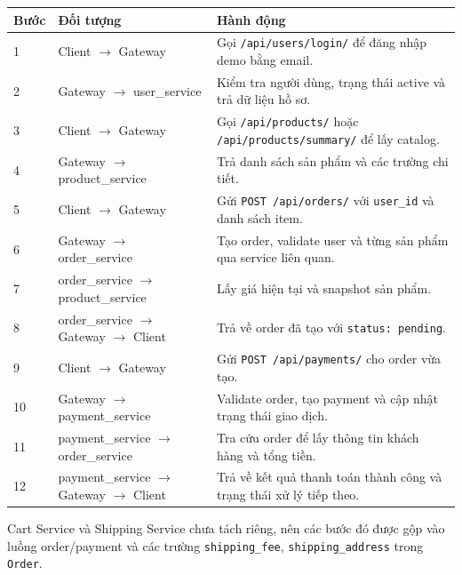 \documentclass[12pt,a4paper]{article}
\begin{document}
\begin{longtable}{p{1.4cm}p{3.6cm}p{8.2cm}}
\toprule
\textbf{Bước} & \textbf{Đối tượng} & \textbf{Hành động} \\
\midrule
1 & Client $\rightarrow$ Gateway & Gọi \texttt{/api/users/login/} để đăng nhập demo bằng email. \\
2 & Gateway $\rightarrow$ user\_service & Kiểm tra người dùng, trạng thái active và trả dữ liệu hồ sơ. \\
3 & Client $\rightarrow$ Gateway & Gọi \texttt{/api/products/} hoặc \texttt{/api/products/summary/} để lấy catalog. \\
4 & Gateway $\rightarrow$ product\_service & Trả danh sách sản phẩm và các trường chi tiết. \\
5 & Client $\rightarrow$ Gateway & Gửi \texttt{POST /api/orders/} với \texttt{user\_id} và danh sách item. \\
6 & Gateway $\rightarrow$ order\_service & Tạo order, validate user và từng sản phẩm qua service liên quan. \\
7 & order\_service $\rightarrow$ product\_service & Lấy giá hiện tại và snapshot sản phẩm. \\
8 & order\_service $\rightarrow$ Gateway $\rightarrow$ Client & Trả về order đã tạo với \texttt{status: pending}. \\
9 & Client $\rightarrow$ Gateway & Gửi \texttt{POST /api/payments/} cho order vừa tạo. \\
10 & Gateway $\rightarrow$ payment\_service & Validate order, tạo payment và cập nhật trạng thái giao dịch. \\
11 & payment\_service $\rightarrow$ order\_service & Tra cứu order để lấy thông tin khách hàng và tổng tiền. \\
12 & payment\_service $\rightarrow$ Gateway $\rightarrow$ Client & Trả về kết quả thanh toán thành công và trạng thái xử lý tiếp theo. \\
\bottomrule
\end{longtable}

Cart Service và Shipping Service chưa tách riêng, nên các bước đó được gộp vào luồng order/payment và các trường \texttt{shipping\_fee}, \texttt{shipping\_address} trong \texttt{Order}.
\end{document}
